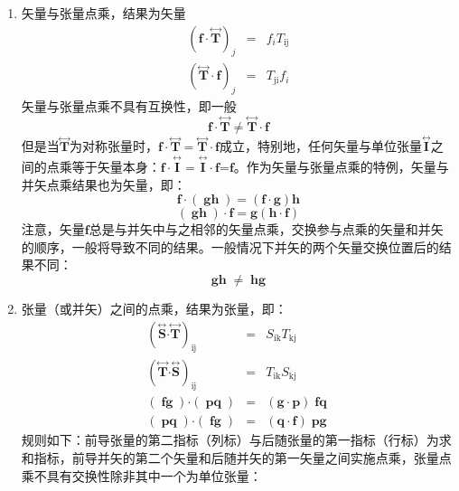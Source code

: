 \documentclass[UTF8]{ctexart}
\newcommand{\tmmathbf}[1]{\ensuremath{\boldsymbol{#1}}}
\newcommand{\tmop}[1]{\ensuremath{\operatorname{#1}}}
\newcommand{\tmtextbf}[1]{{\bfseries{#1}}}
\newenvironment{enumeratenumeric}{\begin{enumerate}[1.] }{\end{enumerate}}
\begin{document}
\begin{enumeratenumeric}
  \item 矢量与张量点乘，结果为矢量
  \begin{eqnarray*}
    \left( \tmmathbf{f \cdot \overset{\longleftrightarrow \text{}}{T}}
    \right)_j & = & f_i T_{\tmop{ij}}\\
    \left( \tmmathbf{\overset{\longleftrightarrow \text{}}{T} \cdot f}
    \right)_j & = & T_{\tmop{ji}} f_i
  \end{eqnarray*}
  矢量与张量点乘不具有互换性，即一般
  \[ \tmmathbf{f \cdot \overset{\longleftrightarrow \text{}}{T}} \neq
     \tmmathbf{\overset{\longleftrightarrow \text{}}{T} \cdot f} \]
  但是当$\overset{\longleftrightarrow
  \text{}}{\tmmathbf{T}}$为对称张量时，$\tmmathbf{f \cdot
  \overset{\longleftrightarrow \text{}}{T}} =
  \tmmathbf{\overset{\longleftrightarrow \text{}}{T} \cdot
  f}$成立，特别地，任何矢量与单位张量$\overset{\longleftrightarrow}{\tmmathbf{I}}$之间的点乘等于矢量本身：$\tmmathbf{f
  \cdot \overset{\longleftrightarrow \text{}}{I}} =
  \tmmathbf{\overset{\longleftrightarrow \text{}}{I} \cdot
  f}$=\tmtextbf{$\tmmathbf{f}$}。作为矢量与张量点乘的特例，矢量与并矢点乘结果也为矢量，即：
  \[ \tmmathbf{f \cdot (\tmop{gh}) = (f \cdot g) h} \]
  \[ \tmmathbf{(\tmop{gh}) \cdot f} = \tmmathbf{g (h \cdot f)} \]
  注意，矢量\tmtextbf{$\tmmathbf{f}$}总是与并矢中与之相邻的矢量点乘，交换参与点乘的矢量和并矢的顺序，一般将导致不同的结果。一般情况下并矢的两个矢量交换位置后的结果不同：
  \[ \tmmathbf{\tmop{gh} \neq \tmop{hg}} \]
  \item 张量（或并矢）之间的点乘，结果为张量，即：
  \begin{eqnarray*}
    \left( \overset{\longleftrightarrow}{\tmmathbf{S}} \tmmathbf{\cdot}
    \overset{\longleftrightarrow}{\tmmathbf{T}} \right)_{\tmop{ij}} & = &
    S_{\tmop{ik}} T_{\tmop{kj}}\\
    \left( \overset{\longleftrightarrow}{\tmmathbf{T}} \tmmathbf{\cdot}
    \overset{\longleftrightarrow}{\tmmathbf{S}} \right)_{\tmop{ij}} & = &
    T_{\tmop{ik}} S_{\tmop{kj}}\\
    (\tmmathbf{\tmop{fg}}) \tmmathbf{\cdot (\tmop{pq})} & = & (\tmmathbf{g
    \cdot p}) \tmmathbf{\tmop{fq}}\\
    (\tmmathbf{\tmop{pq}}) \tmmathbf{\cdot} (\tmmathbf{\tmop{fg}}) & = &
    (\tmmathbf{q \cdot f}) \tmmathbf{\tmop{pg}}
  \end{eqnarray*}
  规则如下：前导张量的第二指标（列标）与后随张量的第一指标（行标）为求和指标，前导并矢的第二个矢量和后随并矢的第一矢量之间实施点乘，张量点乘不具有交换性除非其中一个为单位张量：

\end{enumeratenumeric}
\end{document}
